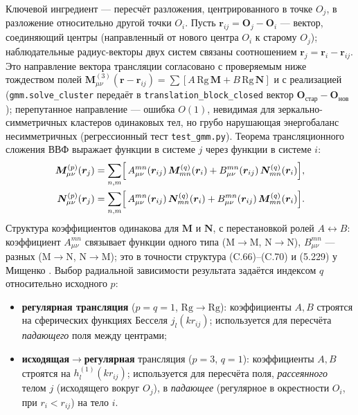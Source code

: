 \documentclass[11pt,a4paper]{article}
\begin{document}
Ключевой ингредиент --- пересчёт разложения, центрированного в точке $O_j$, в разложение относительно другой точки $O_i$. Пусть $\bm{r}_{ij}=\bm{O}_j-\bm{O}_i$ --- вектор, соединяющий центры (направленный от нового центра $O_i$ к старому $O_j$); наблюдательные радиус-векторы двух систем связаны соотношением $\bm{r}_j=\bm{r}_i-\bm{r}_{ij}$. Это направление вектора трансляции согласовано с проверяемым ниже тождеством полей $\bm M^{(3)}_{\mu\nu}(\bm r-\bm r_{ij})=\sum[A\,\mathrm{Rg}\,\bm M+B\,\mathrm{Rg}\,\bm N]$ и с реализацией (\texttt{gmm.solve\_cluster} передаёт в \texttt{translation\_block\_closed} вектор $\bm{O}_{\mathrm{стар}}-\bm{O}_{\mathrm{нов}}$); перепутанное направление --- ошибка $O(1)$, невидимая для зеркально-симметричных кластеров одинаковых тел, но грубо нарушающая энергобаланс несимметричных (регрессионный тест \texttt{test\_gmm.py}). Теорема трансляционного сложения ВВФ \cite{stein1961,cruzan1962,mishchenko2002} выражает функции в системе $j$ через функции в системе $i$:
\begin{align}
\bm{M}_{\mu\nu}^{(p)}(\bm{r}_j)
&= \sum_{n,m}\Bigl[\, A_{\mu\nu}^{mn}(\bm{r}_{ij})\,\bm{M}_{mn}^{(q)}(\bm{r}_i)
+ B_{\mu\nu}^{mn}(\bm{r}_{ij})\,\bm{N}_{mn}^{(q)}(\bm{r}_i)\Bigr],
\label{tmatrix-eq:tm-addM}\\
\bm{N}_{\mu\nu}^{(p)}(\bm{r}_j)
&= \sum_{n,m}\Bigl[\, A_{\mu\nu}^{mn}(\bm{r}_{ij})\,\bm{N}_{mn}^{(q)}(\bm{r}_i)
+ B_{\mu\nu}^{mn}(\bm{r}_{ij})\,\bm{M}_{mn}^{(q)}(\bm{r}_i)\Bigr].
\label{tmatrix-eq:tm-addN}
\end{align}
Структура коэффициентов одинакова для $\bm{M}$ и $\bm{N}$, с перестановкой ролей $A\leftrightarrow B$: коэффициент $A_{\mu\nu}^{mn}$ связывает функции одного типа (M$\to$M, N$\to$N), $B_{\mu\nu}^{mn}$ --- разных (M$\to$N, N$\to$M); это в точности структура (C.66)--(C.70) и (5.229) у Мищенко \cite{mishchenko2002}. Выбор радиальной зависимости результата задаётся индексом $q$ относительно исходного $p$:
\begin{itemize}
\item \textbf{регулярная трансляция} ($p=q=1$, $\mathrm{Rg}\to\mathrm{Rg}$): коэффициенты $A,B$ строятся на сферических функциях Бесселя $j_l(k r_{ij})$; используется для пересчёта \emph{падающего} поля между центрами;
\item \textbf{исходящая$\to$регулярная} трансляция ($p=3$, $q=1$): коэффициенты $A,B$ строятся на $h_l^{(1)}(k r_{ij})$; используется для пересчёта поля, \emph{рассеянного} телом $j$ (исходящего вокруг $O_j$), в \emph{падающее} (регулярное в окрестности $O_i$, при $r_i<r_{ij}$) на тело $i$.
\end{itemize}
\end{document}
